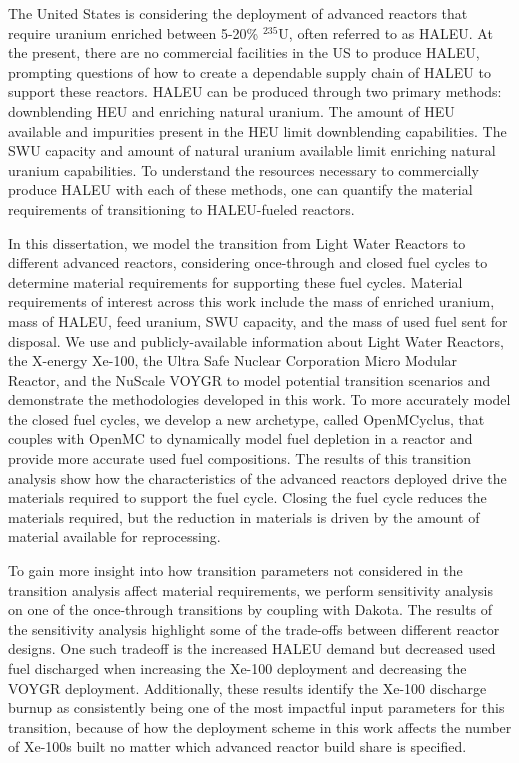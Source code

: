 The United States is considering the deployment of advanced reactors that 
require uranium enriched between 5-20\% $^{235}$U, often referred to 
as \gls{HALEU}. At the present, there are no commercial facilities 
in the US to produce \gls{HALEU}, 
prompting questions of how to create a dependable supply chain of 
\gls{HALEU} to support these reactors. 
\gls{HALEU} can be produced through two primary methods: downblending 
\gls{HEU} and enriching natural uranium. The amount of \gls{HEU} available 
and impurities present in the \gls{HEU} limit downblending capabilities.
The \gls{SWU} capacity and amount of natural uranium available limit 
enriching natural uranium capabilities. To understand the resources necessary 
to commercially produce \gls{HALEU} with each of these methods, one can 
quantify the material requirements of transitioning to \gls{HALEU}-fueled 
reactors. 

In this dissertation, we model the transition from Light Water 
Reactors to different 
advanced reactors, considering once-through and closed 
fuel cycles to determine material requirements for supporting 
these fuel cycles. 
Material requirements of interest across this work include the 
mass of enriched uranium, mass of \gls{HALEU}, feed uranium, 
\gls{SWU} capacity, and the mass of used fuel sent for disposal.
We use \Cyclus and publicly-available 
information about Light Water Reactors, the X-energy Xe-100, the
Ultra Safe Nuclear Corporation Micro Modular Reactor, and the 
NuScale VOYGR to model potential transition scenarios and demonstrate 
the methodologies developed in this work.
To more accurately model the closed fuel 
cycles, we develop a new \Cyclus archetype, called OpenMCyclus, 
that couples with OpenMC to dynamically model fuel depletion in a 
reactor and provide more accurate used fuel compositions.
The results of this transition analysis show how the 
characteristics of the advanced reactors deployed drive 
the materials required to support the fuel cycle. Closing the 
fuel cycle reduces the materials required, but the 
reduction in materials is driven by the amount of material 
available for reprocessing. 

To gain more insight into how transition parameters not 
considered in the transition analysis affect material 
requirements, we perform sensitivity 
analysis on one of the once-through transitions by coupling 
\Cyclus with Dakota. The results of 
the sensitivity analysis highlight some of the trade-offs between 
different reactor designs. One such tradeoff is the increased 
\gls{HALEU} demand but decreased used fuel discharged when increasing 
the Xe-100 deployment and decreasing the VOYGR deployment. Additionally, 
these results identify the Xe-100 discharge burnup as consistently 
being one of the most impactful input parameters for this transition, 
because of how the deployment scheme in this work affects the number of 
Xe-100s built no matter which advanced reactor build share is 
specified. 

